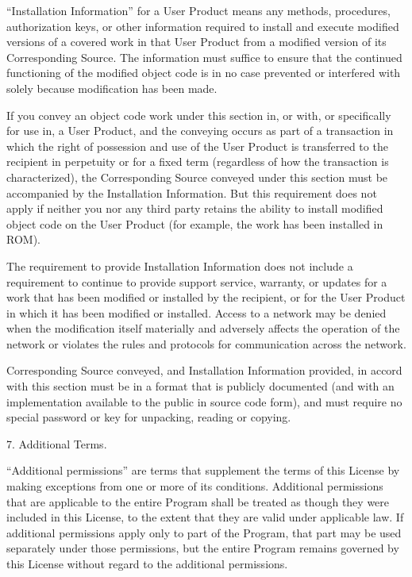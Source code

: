\documentclass[letterpaper,12pt]{article}
\begin{document}
{``Installation Information'' for a User Product means any methods, procedures, authorization keys, or other information required to install and execute modified versions of a covered work in that User Product from a modified version of its Corresponding Source. The information must suffice to ensure that the continued functioning of the modified object code is in no case prevented or interfered with solely because modification has been made.

If you convey an object code work under this section in, or with, or specifically for use in, a User Product, and the conveying occurs as part of a transaction in which the right of possession and use of the User Product is transferred to the recipient in perpetuity or for a fixed term (regardless of how the transaction is characterized), the Corresponding Source conveyed under this section must be accompanied by the Installation Information. But this requirement does not apply if neither you nor any third party retains the ability to install modified object code on the User Product (for example, the work has been installed in ROM).

The requirement to provide Installation Information does not include a requirement to continue to provide support service, warranty, or updates for a work that has been modified or installed by the recipient, or for the User Product in which it has been modified or installed. Access to a network may be denied when the modification itself materially and adversely affects the operation of the network or violates the rules and protocols for communication across the network.

Corresponding Source conveyed, and Installation Information provided, in accord with this section must be in a format that is publicly documented (and with an implementation available to the public in source code form), and must require no special password or key for unpacking, reading or copying.

7. Additional Terms.

``Additional permissions'' are terms that supplement the terms of this License by making exceptions from one or more of its conditions. Additional permissions that are applicable to the entire Program shall be treated as though they were included in this License, to the extent that they are valid under applicable law. If additional permissions apply only to part of the Program, that part may be used separately under those permissions, but the entire Program remains governed by this License without regard to the additional permissions.

}
\end{document}
